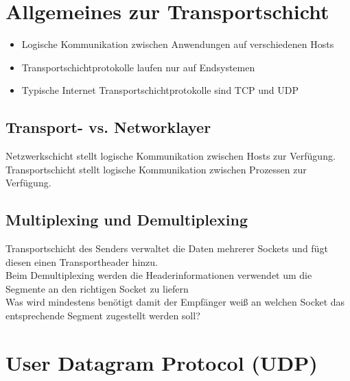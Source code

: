 \section{Allgemeines zur Transportschicht}
\begin{itemize}
    \item Logische Kommunikation zwischen Anwendungen auf verschiedenen Hosts
    \item Transportschichtprotokolle laufen nur auf Endsystemen
    \item Typische Internet Transportschichtprotokolle sind TCP und UDP
\end{itemize}

\subsection{Transport- vs. Networklayer}
Netzwerkschicht stellt logische Kommunikation zwischen Hosts zur Verfügung.\\
\noindent Transportschicht stellt logische Kommunikation zwischen Prozessen zur Verfügung.

\subsection{Multiplexing und Demultiplexing}
Transportschicht des Senders verwaltet die Daten mehrerer Sockets und fügt diesen einen Transportheader hinzu.\\
\noindent Beim Demultiplexing werden die Headerinformationen verwendet um die Segmente an den richtigen Socket zu liefern\\
\hfill \break
Was wird mindestens benötigt damit der Empfänger weiß an welchen Socket das entsprechende Segment zugestellt werden soll?

\section{User Datagram Protocol (UDP)}
